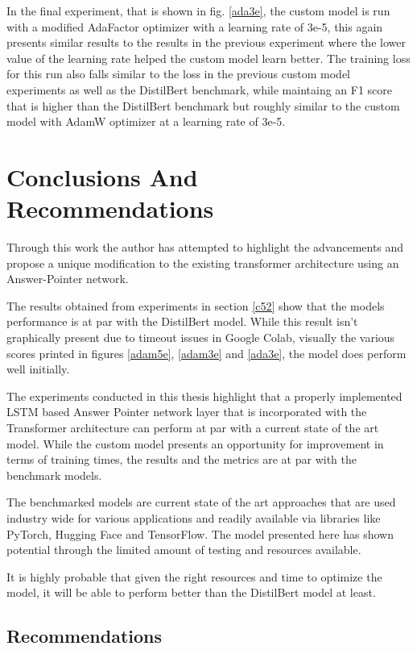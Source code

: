 \documentclass[a4paper,12pt]{report}
\begin{document}
	In the final experiment, that is shown in fig. \ref{ada3e}, the custom model is run with a modified AdaFactor optimizer with a learning rate of 3e-5, this again presents similar results to the results in the previous experiment where the lower value of the learning rate helped the custom model learn better. The training loss for this run also falls similar to the loss in the previous custom model experiments as well as the DistilBert benchmark, while maintaing an F1 score that is higher than the DistilBert benchmark but roughly similar to the custom model with AdamW optimizer at a learning rate of 3e-5.





    \chapter{Conclusions And Recommendations}\label{c6}

    Through this work the author has attempted to highlight the advancements and propose a unique modification to the existing transformer architecture using an Answer-Pointer network.

    The results obtained from experiments in section \ref{c52} show that the models performance is at par with the DistilBert model. While this result isn't graphically present due to timeout issues in Google Colab, visually the various scores printed in figures \ref{adam5e}, \ref{adam3e} and \ref{ada3e}, the model does perform well initially.

    The experiments conducted in this thesis highlight that a properly implemented LSTM based Answer Pointer network layer that is incorporated with the Transformer architecture can perform at par with a current state of the art model.
    While the custom model presents an opportunity for improvement in terms of training times, the results and the metrics are at par with the benchmark models.

    The benchmarked models are current state of the art approaches that are used industry wide for various applications and readily available via libraries like PyTorch, Hugging Face and TensorFlow. The model presented here has shown potential through the limited amount of testing and resources available.

    It is highly probable that given the right resources and time to optimize the model, it will be able to perform better than the DistilBert model at least.

    \section{Recommendations}
\end{document}

